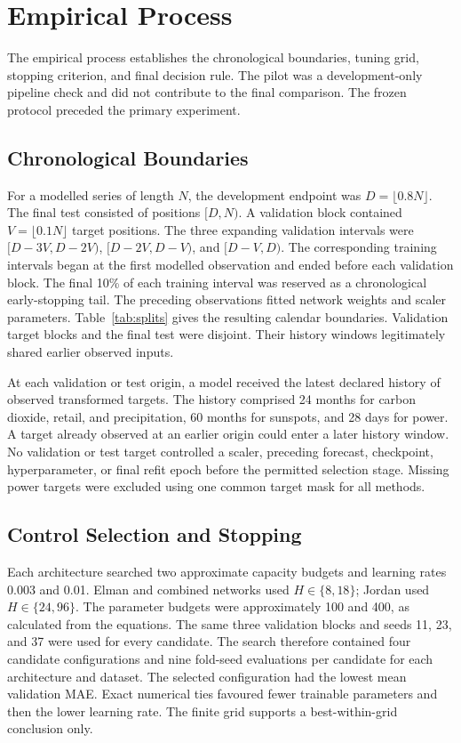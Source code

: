 \documentclass[conference,10pt]{IEEEtran}
\begin{document}
\section{Empirical Process}
The empirical process establishes the chronological boundaries, tuning grid, stopping criterion, and final decision rule. The pilot was a development-only pipeline check and did not contribute to the final comparison. The frozen protocol preceded the primary experiment.

\subsection{Chronological Boundaries}
For a modelled series of length $N$, the development endpoint was $D=\lfloor0.8N\rfloor$. The final test consisted of positions $[D,N)$. A validation block contained $V=\lfloor0.1N\rfloor$ target positions. The three expanding validation intervals were $[D-3V,D-2V)$, $[D-2V,D-V)$, and $[D-V,D)$. The corresponding training intervals began at the first modelled observation and ended before each validation block. The final 10\% of each training interval was reserved as a chronological early-stopping tail. The preceding observations fitted network weights and scaler parameters. Table~\ref{tab:splits} gives the resulting calendar boundaries. Validation target blocks and the final test were disjoint. Their history windows legitimately shared earlier observed inputs.



At each validation or test origin, a model received the latest declared history of observed transformed targets. The history comprised 24 months for carbon dioxide, retail, and precipitation, 60 months for sunspots, and 28 days for power. A target already observed at an earlier origin could enter a later history window. No validation or test target controlled a scaler, preceding forecast, checkpoint, hyperparameter, or final refit epoch before the permitted selection stage. Missing power targets were excluded using one common target mask for all methods.

\subsection{Control Selection and Stopping}
Each architecture searched two approximate capacity budgets and learning rates 0.003 and 0.01. Elman and combined networks used $H\in\{8,18\}$; Jordan used $H\in\{24,96\}$. The parameter budgets were approximately 100 and 400, as calculated from the equations. The same three validation blocks and seeds 11, 23, and 37 were used for every candidate. The search therefore contained four candidate configurations and nine fold-seed evaluations per candidate for each architecture and dataset. The selected configuration had the lowest mean validation MAE. Exact numerical ties favoured fewer trainable parameters and then the lower learning rate. The finite grid supports a best-within-grid conclusion only.
\end{document}
